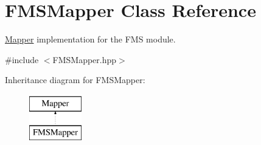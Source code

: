 \hypertarget{classFMSMapper}{
\section{FMSMapper Class Reference}
\label{classFMSMapper}
}


\hyperlink{classMapper}{Mapper} implementation for the FMS module.  




{\ttfamily \#include $<$FMSMapper.hpp$>$}

Inheritance diagram for FMSMapper:\begin{figure}[H]
\begin{center}
\leavevmode
\includegraphics[height=2.000000cm]{classFMSMapper}
\end{center}
\end{figure}
